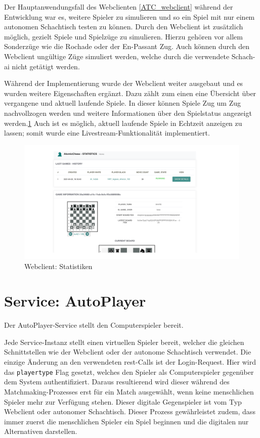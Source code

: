Der Hauptanwendungsfall des Webclienten \ref{ATC_webclient} während der
Entwicklung war es, weitere Spieler zu simulieren und so ein Spiel mit
nur einem autonomen Schachtisch testen zu können. Durch den Webclient
ist zusätzlich möglich, gezielt Spiele und Spielzüge zu simulieren.
Hierzu gehören vor allem Sonderzüge wie die Rochade oder der En-Passant
Zug. Auch können durch den Webclient ungültige Züge simuliert werden,
welche durch die verwendete Schach-\gls{ai} nicht getätigt werden.

Während der Implementierung wurde der Webclient weiter ausgebaut und es
wurden weitere Eigenschaften ergänzt. Dazu zählt zum einen eine
Übersicht über vergangene und aktuell laufende Spiele. In dieser können
Spiele Zug um Zug nachvollzogen werden und weitere Informationen über
den Spielstatus angezeigt werden.\ref{ATC_statistics} Auch ist es
möglich, aktuell laufende Spiele in Echtzeit anzeigen zu lassen; somit
wurde eine Livestream-Funktionalität implementiert.

\begin{figure}
\centering
\includegraphics{images/ATC_statistics.png}
\caption{Webclient: Statistiken \label{ATC_statistics}}
\end{figure}

\hypertarget{service-autoplayer}{%
\section{Service: AutoPlayer}\label{service-autoplayer}}

Der AutoPlayer-Service stellt den Computerspieler bereit.

Jede Service-Instanz stellt einen virtuellen Spieler bereit, welcher die
gleichen Schnittstellen wie der Webclient oder der autonome Schachtisch
verwendet. Die einzige Änderung an den verwendeten \gls{rest}-Calls ist
der Login-Request. Hier wird das \passthrough{\lstinline!playertype!}
Flag gesetzt, welches den Spieler als Computerspieler gegenüber dem
System authentifiziert. Daraus resultierend wird dieser während des
Matchmaking-Prozesses erst für ein Match ausgewählt, wenn keine
menschlichen Spieler mehr zur Verfügung stehen. Dieser digitale
Gegenspieler ist vom Typ Webclient oder autonomer Schachtisch. Dieser
Prozess gewährleistet zudem, dass immer zuerst die menschlichen Spieler
ein Spiel beginnen und die digitalen nur Alternativen darstellen.

